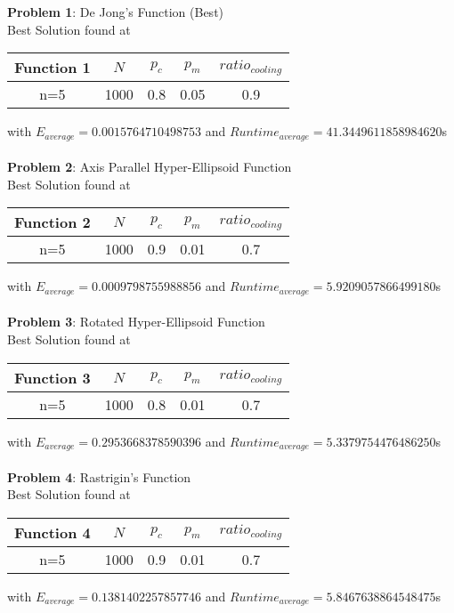 \documentclass{article}
\begin{document}
\textbf{Problem 1}: De Jong's Function (Best)\\
Best Solution found at\\
\begin{center}
\begin{tabular}{ |c|c|c|c|c| } 
\hline
Function 1 & $N$ & $p_c$ & $p_m$ & $ratio_{cooling}$ \\
\hline
\multirow{1}{3em}{n=5}
& 1000 & 0.8 & 0.05 & 0.9 \\
\hline
\end{tabular}
\end{center}
with $E_{average} = 0.0015764710498753$ and $Runtime_{average} = 41.3449611858984620$s\\\\

\textbf{Problem 2}: Axis Parallel Hyper-Ellipsoid Function\\
Best Solution found at\\
\begin{center}
\begin{tabular}{ |c|c|c|c|c| } 
\hline
Function 2 & $N$ & $p_c$ & $p_m$ & $ratio_{cooling}$ \\
\hline
\multirow{1}{3em}{n=5}
& 1000 & 0.9 & 0.01 & 0.7 \\
\hline
\end{tabular}
\end{center}
with $E_{average} =0.0009798755988856$ and $Runtime_{average} = 5.9209057866499180$s\\\\

\textbf{Problem 3}: Rotated Hyper-Ellipsoid Function\\
Best Solution found at\\
\begin{center}
\begin{tabular}{ |c|c|c|c|c| } 
\hline
Function 3 & $N$ & $p_c$ & $p_m$ & $ratio_{cooling}$ \\
\hline
\multirow{1}{3em}{n=5}
& 1000 & 0.8 & 0.01 & 0.7 \\
\hline
\end{tabular}
\end{center}
with $E_{average} = 0.2953668378590396$ and $Runtime_{average} = 5.3379754476486250$s\\\\

\textbf{Problem 4}: Rastrigin's Function\\
Best Solution found at\\
\begin{center}
\begin{tabular}{ |c|c|c|c|c| } 
\hline
Function 4 & $N$ & $p_c$ & $p_m$ & $ratio_{cooling}$ \\
\hline
\multirow{1}{3em}{n=5}
& 1000 & 0.9 & 0.01 & 0.7 \\
\hline
\end{tabular}
\end{center}
with $E_{average} = 0.1381402257857746$ and $Runtime_{average} = 5.8467638864548475$s\\\\
\end{document}
